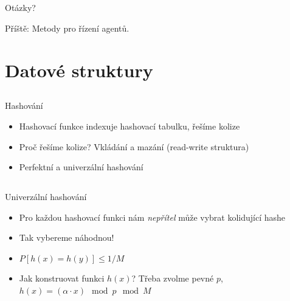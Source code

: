 \documentclass{beamer}
\begin{document}
\subsection{}
\begin{frame}{Otázky?}
\begin{center}
Příště: Metody pro řízení agentů.
\end{center}
\end{frame}

\section{Datové struktury}

\subsection{}
\begin{frame}{Hashování}
\begin{itemize}
\item Hashovací funkce indexuje hashovací tabulku, řešíme kolize
\item Proč řešíme kolize? Vkládání a mazání (read-write struktura)
\item Perfektní a univerzální hashování
\end{itemize}
\end{frame}

\subsection{}
\begin{frame}{Univerzální hashování}
\begin{itemize}
\item Pro každou hashovací funkci nám {\em nepřítel} může vybrat kolidující hashe
\item Tak vybereme náhodnou!
\item $P[h(x) = h(y)] \le 1/M$
\item Jak konstruovat funkci $h(x)$? Třeba zvolme pevné $p$, $h(x) = (\alpha \cdot x) \mod p \mod M$
\end{itemize}
\end{frame}
\end{document}
